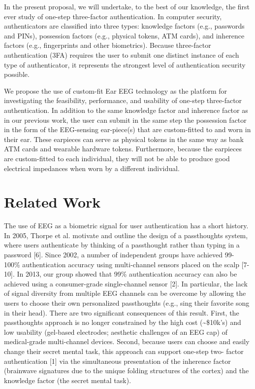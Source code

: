 \documentclass[11pt]{article}
\begin{document}
In the present proposal, we will undertake, to the best of our knowledge, the first
ever study of one-step three-factor authentication. In computer security,
authenticators are classified into three types: knowledge factors (e.g., passwords
and PINs), possession factors (e.g., physical tokens, ATM cards), and inherence
factors (e.g., fingerprints and other biometrics). Because three-factor
authentication (3FA) requires the user to submit one distinct instance of each
type of authenticator, it represents the strongest level of authentication security
possible.

We propose the use of custom-fit Ear EEG technology as the platform for
investigating the feasibility, performance, and usability of one-step three-factor
authentication. In addition to the same knowledge factor and inherence factor as
in our previous work, the user can submit in the same step the possession factor
in the form of the EEG-sensing ear-piece(s) that are custom-fitted to and worn in
their ear. These earpieces can serve as physical tokens in the same way as bank
ATM cards and wearable hardware tokens. Furthermore, because the earpieces
are custom-fitted to each individual, they will not be able to produce good
electrical impedances when worn by a different individual.

\section{Related Work}
\label{sec:orge0e46dc}
The use of EEG as a biometric signal for user authentication has a short history.
In 2005, Thorpe et al. motivate and outline the design of a passthoughts system,
where users authenticate by thinking of a passthought rather than typing in a
password [6]. Since 2002, a number of independent groups have achieved 99-
100\% authentication accuracy using multi-channel sensors placed on the scalp
[7-10]. In 2013, our group showed that 99\% authentication accuracy can also be
achieved using a consumer-grade single-channel sensor [2]. In particular, the
lack of signal diversity from multiple EEG channels can be overcome by allowing
the users to choose their own personalized passthoughts (e.g., sing their favorite
song in their head). There are two significant consequences of this result. First,
the passthoughts approach is no longer constrained by the high cost (\textasciitilde{}\$10k’s)
and low usability (gel-based electrodes; aesthetic challenges of an EEG cap) of
medical-grade multi-channel devices. Second, because users can choose and
easily change their secret mental task, this approach can support one-step two-
factor authentication [1] via the simultaneous presentation of the inherence factor
(brainwave signatures due to the unique folding structures of the cortex) and the
knowledge factor (the secret mental task).
\end{document}
